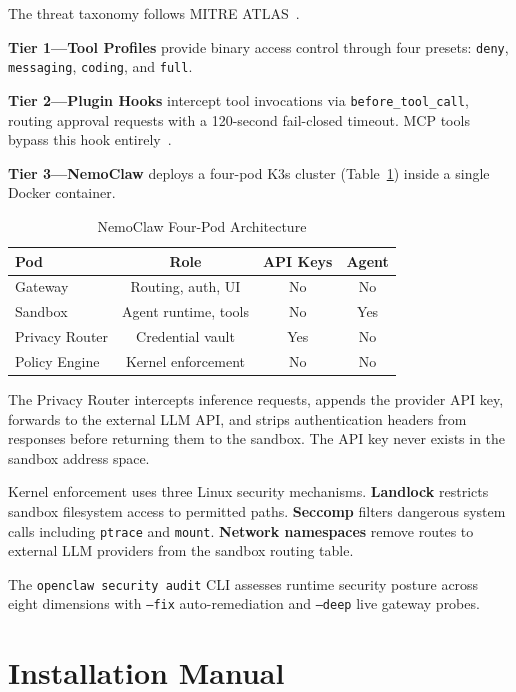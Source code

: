 \documentclass[journal]{IEEEtran}
\begin{document}
The threat taxonomy follows MITRE ATLAS~\cite{mitre2024atlas}.

\textbf{Tier 1---Tool Profiles} provide binary access control through four
presets: \texttt{deny}, \texttt{messaging}, \texttt{coding}, and \texttt{full}.

\textbf{Tier 2---Plugin Hooks} intercept tool invocations via
\texttt{before\_tool\_call}, routing approval requests with a 120-second
fail-closed timeout. MCP tools bypass this hook
entirely~\cite{openclaw2024docs}.

\textbf{Tier 3---NemoClaw} deploys a four-pod K3s cluster (Table~\ref{tab:nemoclaw})
inside a single Docker container.

\begin{table}[!t]
\renewcommand{\arraystretch}{1.3}
\caption{NemoClaw Four-Pod Architecture}
\label{tab:nemoclaw}
\centering
\begin{tabular}{lccc}
\toprule
\textbf{Pod} & \textbf{Role} & \textbf{API Keys} & \textbf{Agent} \\
\midrule
Gateway       & Routing, auth, UI    & No  & No  \\
Sandbox       & Agent runtime, tools & No  & Yes \\
Privacy Router & Credential vault    & Yes & No  \\
Policy Engine & Kernel enforcement   & No  & No  \\
\bottomrule
\end{tabular}
\end{table}

The Privacy Router intercepts inference requests, appends the provider API key,
forwards to the external LLM API, and strips authentication headers from
responses before returning them to the sandbox. The API key never exists in
the sandbox address space.

Kernel enforcement uses three Linux security mechanisms. \textbf{Landlock}
restricts sandbox filesystem access to permitted paths. \textbf{Seccomp}
filters dangerous system calls including \texttt{ptrace} and \texttt{mount}.
\textbf{Network namespaces} remove routes to external LLM providers from the
sandbox routing table.

The \texttt{openclaw security audit} CLI assesses runtime security posture
across eight dimensions with \texttt{--fix} auto-remediation and \texttt{--deep}
live gateway probes.

\section{Installation Manual}
\end{document}
